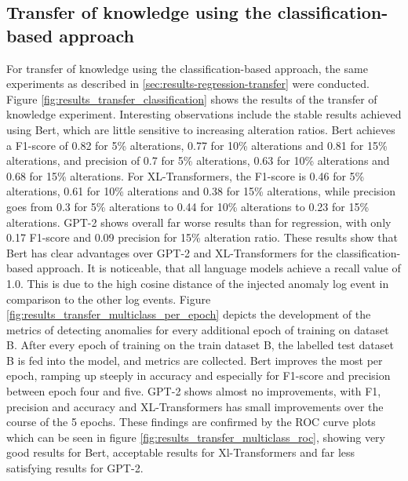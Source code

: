 \subsection{Transfer of knowledge using the classification-based approach \label{sec:results-classification-transfer}}

For transfer of knowledge using the classification-based approach, the same experiments as described in \ref{sec:results-regression-transfer} were conducted. Figure \ref{fig:results_transfer_classification} shows the results of the transfer of knowledge experiment. Interesting observations include the stable results achieved using Bert, which are little sensitive to increasing alteration ratios. Bert achieves a F1-score of 0.82 for 5\% alterations, 0.77 for 10\% alterations and 0.81 for 15\% alterations, and precision of 0.7 for 5\% alterations, 0.63 for 10\% alterations and 0.68 for 15\% alterations. For XL-Transformers, the F1-score is 0.46 for 5\% alterations, 0.61 for 10\% alterations and 0.38 for 15\% alterations, while precision goes from 0.3 for 5\% alterations to 0.44 for 10\% alterations to 0.23 for 15\% alterations. GPT-2 shows overall far worse results than for regression, with only 0.17 F1-score and 0.09 precision for 15\% alteration ratio.
These results show that Bert has clear advantages over GPT-2 and XL-Transformers for the classification-based approach. It is noticeable, that all language models achieve a recall value of 1.0. This is due to the high cosine distance of the injected anomaly log event in comparison to the other log events.
Figure \ref{fig:results_transfer_multiclass_per_epoch} depicts the development of the metrics of detecting anomalies for every additional epoch of training on dataset B. After every epoch of training on the train dataset B, the labelled test dataset B is fed into the model, and metrics are collected. Bert improves the most per epoch, ramping up steeply in accuracy and especially for F1-score and precision between epoch four and five. GPT-2 shows almost no improvements, with F1, precision and accuracy and XL-Transformers has small improvements over the course of the 5 epochs. These findings are confirmed by the ROC curve plots which can be seen in figure \ref{fig:results_transfer_multiclass_roc}, showing very good results for Bert, acceptable results for Xl-Transformers and far less satisfying results for GPT-2.

  
